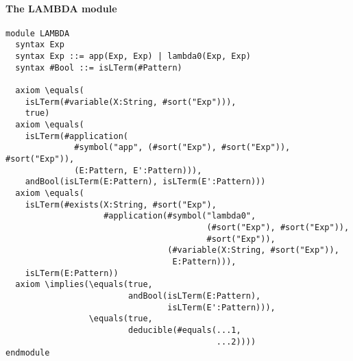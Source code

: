 \documentclass[UTF8]{article}
\theoremstyle{plain}
\theoremstyle{definition}
\theoremstyle{remark}
\begin{document}
\paragraph{The {\small LAMBDA} module}\quad
\begin{Verbatim}[fontsize=\small]
module LAMBDA
  syntax Exp
  syntax Exp ::= app(Exp, Exp) | lambda0(Exp, Exp)
  syntax #Bool ::= isLTerm(#Pattern)

  axiom \equals(
    isLTerm(#variable(X:String, #sort("Exp"))), 
    true)
  axiom \equals(
    isLTerm(#application(
              #symbol("app", (#sort("Exp"), #sort("Exp")), #sort("Exp")),
              (E:Pattern, E':Pattern))),
    andBool(isLTerm(E:Pattern), isLTerm(E':Pattern)))
  axiom \equals(
    isLTerm(#exists(X:String, #sort("Exp"),
                    #application(#symbol("lambda0",
                                         (#sort("Exp"), #sort("Exp")),
                                         #sort("Exp")),
                                 (#variable(X:String, #sort("Exp")),
                                  E:Pattern))),
    isLTerm(E:Pattern))
  axiom \implies(\equals(true, 
                         andBool(isLTerm(E:Pattern), 
                                 isLTerm(E':Pattern))),
                 \equals(true,
                         deducible(#equals(...1,
                                           ...2)))) 
endmodule
\end{Verbatim}
\end{document}
